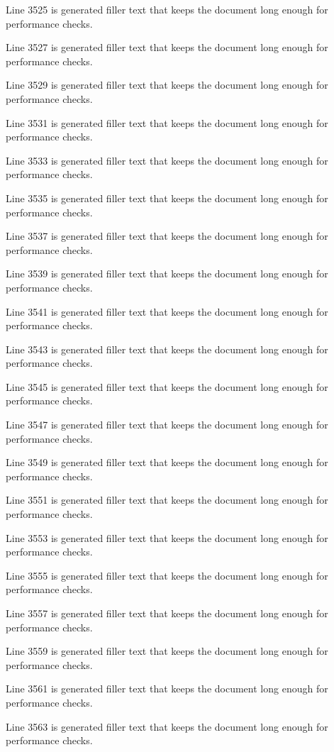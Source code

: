 Line 3525 is generated filler text that keeps the document long enough for performance checks.

Line 3527 is generated filler text that keeps the document long enough for performance checks.

Line 3529 is generated filler text that keeps the document long enough for performance checks.

Line 3531 is generated filler text that keeps the document long enough for performance checks.

Line 3533 is generated filler text that keeps the document long enough for performance checks.

Line 3535 is generated filler text that keeps the document long enough for performance checks.

Line 3537 is generated filler text that keeps the document long enough for performance checks.

Line 3539 is generated filler text that keeps the document long enough for performance checks.

Line 3541 is generated filler text that keeps the document long enough for performance checks.

Line 3543 is generated filler text that keeps the document long enough for performance checks.

Line 3545 is generated filler text that keeps the document long enough for performance checks.

Line 3547 is generated filler text that keeps the document long enough for performance checks.

Line 3549 is generated filler text that keeps the document long enough for performance checks.

Line 3551 is generated filler text that keeps the document long enough for performance checks.

Line 3553 is generated filler text that keeps the document long enough for performance checks.

Line 3555 is generated filler text that keeps the document long enough for performance checks.

Line 3557 is generated filler text that keeps the document long enough for performance checks.

Line 3559 is generated filler text that keeps the document long enough for performance checks.

Line 3561 is generated filler text that keeps the document long enough for performance checks.

Line 3563 is generated filler text that keeps the document long enough for performance checks.

